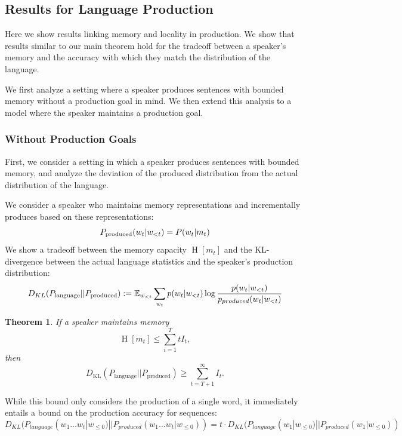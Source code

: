 \documentclass[11pt,letterpaper]{article}
\newcommand{\E}[0]{\mathbb{E}}
\newcounter{theorem}
\newtheorem{thm}[theorem]{Theorem}
\begin{document}
\subsection{Results for Language Production}

Here we show results linking memory and locality in production.
We show that results similar to our main theorem hold for the tradeoff between a speaker's memory and the accuracy with which they match the distribution of the language.

We first analyze a setting where a speaker produces sentences with bounded memory without a production goal in mind.
We then extend this analysis to a model where the speaker maintains a production goal.

\subsubsection{Without Production Goals}
First, we consider a setting in which a speaker produces sentences with bounded memory, and analyze the deviation of the produced distribution from the actual distribution of the language.

We consider a speaker who maintains memory representations and incrementally produces based on these representations:
\begin{equation}
P_\text{produced}(w_t|w_{<t}) = P(w_t|m_t) \\
\end{equation}
We show a tradeoff between the memory capacity $\operatorname{H}[m_t]$ and the KL-divergence between the actual language statistics and the speaker's production distribution:
\begin{equation}
D_{KL}(P_\text{language}||P_\text{produced})  := \E_{w_{<t}} \sum_{w_t} p(w_t|w_{<t}) \log \frac{p(w_t|w_{<t})}{p_{produced}(w_t|w_{<t})} \\
\end{equation}
\begin{thm}
If a speaker maintains memory
	\begin{equation}
		\operatorname{H}[m_t] \leq \sum_{i=1}^T tI_t,
	\end{equation}
	then 
\begin{equation}
	D_{\text{KL}}(P_\text{language}||P_\text{produced}) \geq \sum_{t=T+1}^\infty I_t.
\end{equation}
\end{thm}

While this bound only considers the production of a single word, it immediately entails a bound on the production accuracy for sequences:
\begin{equation}
	D_{KL}(P_{language}(w_1\dots w_t|w_{\leq 0})||P_{produced}(w_1\dots w_t|w_{\leq 0}))  = t \cdot D_{KL}(P_{language}(w_1|w_{\leq 0})||P_{produced}(w_1|w_{\leq 0}))
\end{equation}
\end{document}
